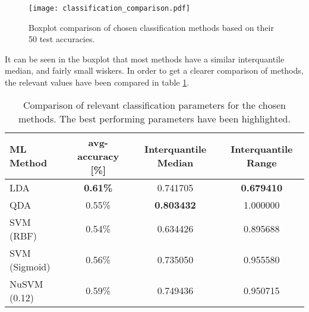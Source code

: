 \documentclass[../main.tex]{subfiles}
\begin{document}
\begin{figure}[H]
\begin{center}
\texttt{[image: classification\_comparison.pdf]}
\caption{Boxplot comparison of chosen classification methods based on their 50 test accuracies.}
\label{fig:classification_comparison}
\end{center}
\end{figure}

It can be seen in the boxplot that most methods have a similar interquantile median, and fairly small wiskers.
In order to get a clearer comparison of methods, the relevant values have been compared in table \ref{tab:classification_comparison}.  

\begin{table}[H]
\begin{center}
\begin{tabular}{ |l|c|c|c| } 
 \hline
 ML Method & avg-accuracy [\%] & Interquantile Median & Interquantile Range \\ 
 \hline
 LDA & \textbf{0.61\%}           & 0.741705 & \textbf{0.679410} \\ 
 QDA & 0.55\%           & \textbf{0.803432} & 1.000000 \\ 
 SVM (RBF) & 0.54\%     & 0.634426 & 0.895688 \\ 
 SVM (Sigmoid) & 0.56\% & 0.735050 & 0.955580 \\ 
 NuSVM (0.12) & 0.59\%  & 0.749436 & 0.950715 \\ 
 \hline
\end{tabular}
\caption{Comparison of relevant classification parameters for the chosen methods. The best performing parameters have been highlighted.}
\label{tab:classification_comparison}
\end{center}
\end{table}

\end{document}
